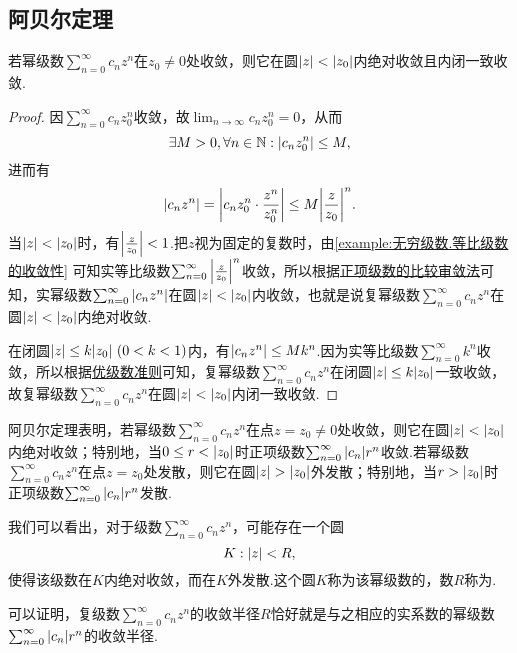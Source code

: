 \subsection{阿贝尔定理}
\begin{theorem}[阿贝尔定理]\label{theorem:解析函数的级数表示.阿贝尔定理}
若幂级数\(\sum_{n=0}^\infty c_n z^n\)在\(z_0 \neq 0\)处收敛，则它在圆\(\abs{z} < \abs{z_0}\)内绝对收敛且内闭一致收敛.
\begin{proof}
因\(\sum_{n=0}^\infty c_n z_0^n\)收敛，故\(\lim_{n\to\infty} c_n z_0^n = 0\)，从而\[
\exists M > 0, \forall n \in \mathbb{N} : \abs{c_n z_0^n} \leq M,
\]进而有\[
\abs{c_n z^n}
= \abs{c_n z_0^n \cdot \frac{z^n}{z_0^n}}
\leq M \abs{\frac{z}{z_0}}^n.
\]当\(\abs{z} < \abs{z_0}\)时，有\(\abs{\frac{z}{z_0}} < 1\).把\(z\)视为固定的复数时，由\cref{example:无穷级数.等比级数的收敛性} 可知实等比级数\(\sum_{n=0}^\infty \abs{\frac{z}{z_0}}^n\)收敛，所以根据\hyperref[theorem:无穷级数.正项级数的比较审敛法]{正项级数的比较审敛法}可知，实幂级数\(\sum_{n=0}^\infty \abs{c_n z^n}\)在圆\(\abs{z} < \abs{z_0}\)内收敛，也就是说复幂级数\(\sum_{n=0}^\infty c_n z^n\)在圆\(\abs{z} < \abs{z_0}\)内绝对收敛.

在闭圆\(\abs{z} \leq k \abs{z_0}\ (0<k<1)\)内，有\(\abs{c_n z^n} \leq M k^n\).因为实等比级数\(\sum_{n=0}^\infty k^n\)收敛，所以根据\hyperref[theorem:无穷级数.优级数准则]{优级数准则}可知，复幂级数\(\sum_{n=0}^\infty c_n z^n\)在闭圆\(\abs{z} \leq k \abs{z_0}\)一致收敛，故复幂级数\(\sum_{n=0}^\infty c_n z^n\)在圆\(\abs{z} < \abs{z_0}\)内闭一致收敛.
\end{proof}
\end{theorem}
阿贝尔定理表明，若幂级数\(\sum_{n=0}^\infty c_n z^n\)在点\(z = z_0 \neq 0\)处收敛，则它在圆\(\abs{z} < \abs{z_0}\)内绝对收敛；特别地，当\(0 \leq r < \abs{z_0}\)时正项级数\(\sum_{n=0}^\infty \abs{c_n} r^n\)收敛.若幂级数\(\sum_{n=0}^\infty c_n z^n\)在点\(z = z_0\)处发散，则它在圆\(\abs{z} > \abs{z_0}\)外发散；特别地，当\(r > \abs{z_0}\)时正项级数\(\sum_{n=0}^\infty \abs{c_n} r^n\)发散.

我们可以看出，对于级数\(\sum_{n=0}^\infty c_n z^n\)，可能存在一个圆\[
K: \abs{z} < R,
\]使得该级数在\(K\)内绝对收敛，而在\(K\)外发散.这个圆\(K\)称为该幂级数的，数\(R\)称为.

可以证明，复级数\(\sum_{n=0}^\infty c_n z^n\)的收敛半径\(R\)恰好就是与之相应的实系数的幂级数\(\sum_{n=0}^\infty \abs{c_n} r^n\)的收敛半径.

